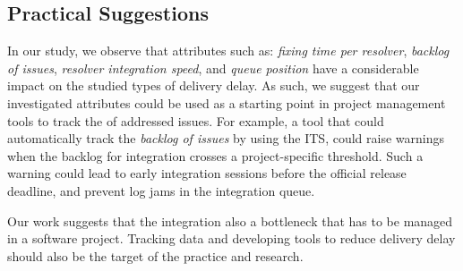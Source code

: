 \subsection{Practical Suggestions}

In our study, we observe that attributes such as: \textit{fixing time per
resolver}, \textit{backlog of issues}, \textit{resolver integration speed}, and
\textit{queue position} have a considerable impact on the studied types of
delivery delay. As such, we suggest that our investigated attributes could be
used as a starting point in project management tools to track the \DIFdelbegin {}\DIFdelend \DIFaddbegin {}\DIFaddend of addressed issues. For example, a tool that could automatically track the
\textit{backlog of issues} by using the ITS, could raise warnings when the
backlog for integration crosses a project-specific threshold. Such a warning
could lead to early integration sessions before the official release deadline,
and prevent log jams in the integration queue. 

Our work suggests that the integration \DIFdelbegin {}\DIFdelend \DIFaddbegin {}\DIFaddend also a bottleneck
that has to be managed in a software project. Tracking data and developing tools
to reduce delivery delay should also be the target of the practice and research.

